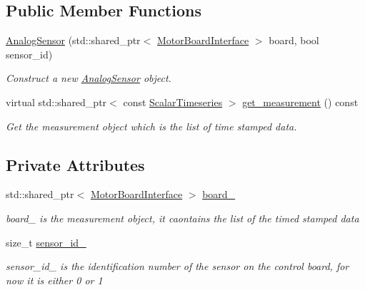\subsection*{Public Member Functions}
\begin{DoxyCompactItemize}
\item 
\hyperlink{classblmc__drivers_1_1AnalogSensor_a3107ba6bba78d46e126ffc74c88f5a69}{Analog\+Sensor} (std\+::shared\+\_\+ptr$<$ \hyperlink{classblmc__drivers_1_1MotorBoardInterface}{Motor\+Board\+Interface} $>$ board, bool sensor\+\_\+id)
\begin{DoxyCompactList}\small\item\em Construct a new \hyperlink{classblmc__drivers_1_1AnalogSensor}{Analog\+Sensor} object. \end{DoxyCompactList}\item 
virtual std\+::shared\+\_\+ptr$<$ const \hyperlink{classblmc__drivers_1_1AnalogSensorInterface_a4e4a853aa044b7d3afbaa3fe20477602}{Scalar\+Timeseries} $>$ \hyperlink{classblmc__drivers_1_1AnalogSensor_af90fc9f142c7855b50f8d295b50d18e6}{get\+\_\+measurement} () const
\begin{DoxyCompactList}\small\item\em Get the measurement object which is the list of time stamped data. \end{DoxyCompactList}\end{DoxyCompactItemize}
\subsection*{Private Attributes}
\begin{DoxyCompactItemize}
\item 
\mbox{\label{classblmc__drivers_1_1AnalogSensor_aba119f9ef91766777134c6df9f687b7c}} 
std\+::shared\+\_\+ptr$<$ \hyperlink{classblmc__drivers_1_1MotorBoardInterface}{Motor\+Board\+Interface} $>$ \hyperlink{classblmc__drivers_1_1AnalogSensor_aba119f9ef91766777134c6df9f687b7c}{board\+\_\+}
\begin{DoxyCompactList}\small\item\em board\+\_\+ is the measurement object, it caontains the list of the timed stamped data \end{DoxyCompactList}\item 
\mbox{\label{classblmc__drivers_1_1AnalogSensor_aaa093ae58c295f8da66bc23d1f241095}} 
size\+\_\+t \hyperlink{classblmc__drivers_1_1AnalogSensor_aaa093ae58c295f8da66bc23d1f241095}{sensor\+\_\+id\+\_\+}
\begin{DoxyCompactList}\small\item\em sensor\+\_\+id\+\_\+ is the identification number of the sensor on the control board, for now it is either 0 or 1 \end{DoxyCompactList}\end{DoxyCompactItemize}
